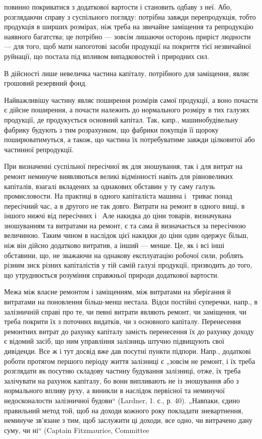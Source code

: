 \parcont{}  %
повинно покриватися з додаткової вартости і становить одбаву з неї. Або, розглядаючи справу з
суспільного погляду: потрібна завжди перепродукція, тобто продукція в ширших розмірах, ніж треба на
звичайне заміщення та репродукцію наявного багатства; це потрібно — зовсім лишаючи осторонь приріст
людности — для того, щоб мати напоготові засоби продукції на покриття тієї незвичайної руйнації, що
постала під впливом випадковостей і природних сил.

В дійсності лише невеличка частина капіталу, потрібного для заміщення, являє грошовий резервний
фонд.

Найважливішу частину являє поширення розмірів самої продукції, а воно почасти є дійсне поширення, а
почасти належить до нормального розміру в тих галузях продукції, де продукується основний капітал.
Так, капр., машинобудівельну фабрику будують з тим розрахунком, що фабрики покупців її щороку
поширюватимуться, а також, що частина їх потребуватиме завжди цілковитої або частинної репродукції.

При визначенні суспільної пересічної як для зношування, так і для витрат на ремонт неминуче
виявляються великі відмінності навіть для рівновеликих капіталів, взагалі вкладених за однакових
обставин у ту саму галузь промисловости. На практиці в одного капіталіста машина і~ триває
понад пересічний час, а в другого не так довго. Витрати на ремонт в одного вищі, в іншого нижчі від
пересічних і~ Але накидка до ціни товарів, визначувана зношуванням та витратами на ремонт, є
та сама й визначається за пересічною величиною. Таким чином в наслідок цієї накидки до ціни один
одержує більш, ніж він дійсно додатково витратив, а інший — менше. Це, як і всі інші обставини, що,
не зважаючи на однакову експлуатацію робочої сили, роблять різним зиск різних капіталістів у тій
самій галузі продукції, призводить до того, що утруднюється розуміння справжньої природи додаткової
вартости.

Межа між власне ремонтом і заміщенням, між витратами на зберігання й витратами на поновлення
більш-менш нестала. Відси постійні суперечки, напр., в залізничній справі про те, чи певні витрати
являють ремонт, чи заміщення, чи треба покрити їх з поточних видатків, чи з основного капіталу.
Перенесення ремонтних витрат до рахунку капіталу замість перенесення їх до рахунку доходу є відомий
засіб, що ним управління залізниць штучно підвищують свої дивіденди. Все ж і тут досвід вже дав
посутні пункти підпори. Напр., додаткові роботи протягом першого періоду життя залізниці є „зовсім
не ремонт, і їх треба розглядати як посутню складову частину будування залізниці, отже, їх треба
залічувати на рахунок капіталу, бо вони випливають не із зношування або з нормального впливу руху, а
виникли в наслідок первісної та неминучої недосконалости залізничної будови“ (Lardner, 1. с., р.
40). „Навпаки, єдино правильний метод той, щоб на доходи кожного року покладати зневартнення,
неминуче зв’язане з тим, щоб заслужити ці доходи, все одно, чи витрачено дану суму, чи ні“ (Captain
Fitzmaurice, Committee
\parbreak{}  %
